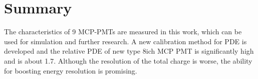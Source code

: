 \section{Summary}
\label{Summary}
The characteristics of 9 MCP-PMTs are measured in this work, which can be used for simulation and further research. A new calibration method for PDE is developed and the relative PDE of new type 8ich MCP PMT is significantly high and is about 1.7. Although the resolution of the total charge is worse, the ability for boosting energy resolution is promising.